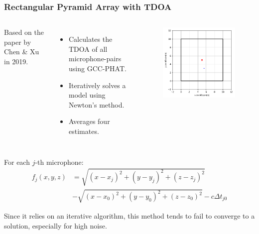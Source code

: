 \documentclass{beamer}
\begin{document}
\begin{frame}
\frametitle{Rectangular Pyramid Array with TDOA}

\begin{columns}

Based on the paper by Chen \& Xu in 2019.
\begin{itemize}
	\item Calculates the TDOA of all microphone-pairs using GCC-PHAT.
	\item Iteratively solves a model using Newton's method.
	\item Averages four estimates.
\end{itemize}

\begin{figure}[H]
\includegraphics[width=1\textwidth]{../Python/pyramid_robot/room_2d_tight.png}
\centering
\end{figure}

\end{columns}

For each $j$-th microphone:
\begin{equation}
\begin{split}
f_j(x,y,z) &= \sqrt{\left(x-x_j\right)^2 + (y - y_j)^2 + (z - z_j)^2} \\
&- \sqrt{\left(x-x_0\right)^2 + (y - y_0)^2 + (z - z_0)^2}
- c \Delta t_{j0}
\end{split}
\end{equation}

Since it relies on an iterative algorithm, this method tends to fail to converge to a solution, especially for high noise.

\end{frame}
\end{document}
